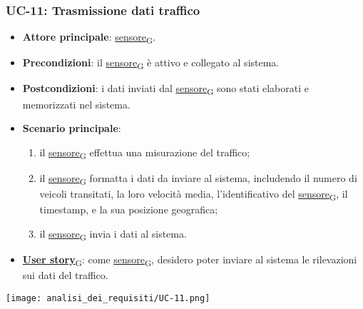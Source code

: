 \subsubsection{UC-11: Trasmissione dati traffico}
\begin{itemize}
	\item \textbf{Attore principale}: \href{https://7last.github.io/docs/pb/documentazione-interna/glossario\#sensore}{sensore\textsubscript{G}}.
	\item \textbf{Precondizioni}: il \href{https://7last.github.io/docs/pb/documentazione-interna/glossario\#sensore}{sensore\textsubscript{G}} è attivo e collegato al sistema.
	\item \textbf{Postcondizioni}: i dati inviati dal \href{https://7last.github.io/docs/pb/documentazione-interna/glossario\#sensore}{sensore\textsubscript{G}} sono stati elaborati e memorizzati nel sistema.
	\item \textbf{Scenario principale}:
	      \begin{enumerate}
		      \item il \href{https://7last.github.io/docs/pb/documentazione-interna/glossario\#sensore}{sensore\textsubscript{G}} effettua una misurazione del traffico;
		      \item il \href{https://7last.github.io/docs/pb/documentazione-interna/glossario\#sensore}{sensore\textsubscript{G}} formatta i dati da inviare al sistema, includendo il numero di veicoli transitati, la loro velocità media, l'identificativo del \href{https://7last.github.io/docs/pb/documentazione-interna/glossario\#sensore}{sensore\textsubscript{G}},
		            il timestamp, e la sua posizione geografica;
		      \item il \href{https://7last.github.io/docs/pb/documentazione-interna/glossario\#sensore}{sensore\textsubscript{G}} invia i dati al sistema.
	      \end{enumerate}
	\item \href{https://7last.github.io/docs/pb/documentazione-interna/glossario\#user-story}{\textbf{User story}\textsubscript{G}}:
	      come \href{https://7last.github.io/docs/pb/documentazione-interna/glossario\#sensore}{sensore\textsubscript{G}}, desidero poter inviare al sistema le rilevazioni sui dati del traffico.
\end{itemize}

\begin{center}
	\texttt{[image: analisi\_dei\_requisiti/UC-11.png]}
\end{center}

